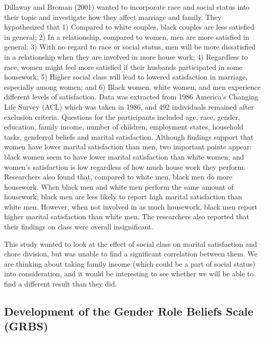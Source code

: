 \documentclass[
  english,
  man]{apa6}
\begin{document}
Dillaway and Broman (2001) wanted to incorporate race and social status into their topic and investigate how they affect marriage and family. They hypothesized that 1) Compared to white couples, black couples are less satisfied in general; 2) In a relationship, compared to women, men are more satisfied in general; 3) With no regard to race or social status, men will be more dissatisfied in a relationship when they are involved in more house work; 4) Regardless to race, women might feel more satisfied if their husbands participated in some housework; 5) Higher social class will lead to lowered satisfaction in marriage, especially among women; and 6) Black women, white women, and men experience different levels of satisfaction. Data was extracted from 1986 America's Changing Life Survey (ACL) which was taken in 1986, and 492 individuals remained after exclusion criteria. Questions for the participants included age, race, gender, education, family income, number of children, employment states, household tasks, genderrol beliefs and marital satisfaction. Although findings support that women have lower marital satisfaction than men, two important points appear: black women seem to have lower marital satisfaction than white women; and women's satisfaction is low regardless of how much house work they perform. Researchers also found that, compared to white men, black men do more housework. When black men and white men perform the same amount of housework, black men are less likely to report high marital satisfaction than white men. However, when not involved in as much housework, black men report higher marital satisfaction than white men. The researchers also reported that their findings on class were overall insignificant.

This study wanted to look at the effect of social class on marital satisfaction and chore division, but was unable to find a significant correlation between them. We are thinking about taking family income (which could be a part of social status) into consideration, and it would be interesting to see whether we will be able to find a different result than they did.

\hypertarget{development-of-the-gender-role-beliefs-scale-grbs}{%
\subsection{Development of the Gender Role Beliefs Scale (GRBS)}\label{development-of-the-gender-role-beliefs-scale-grbs}}
\end{document}
